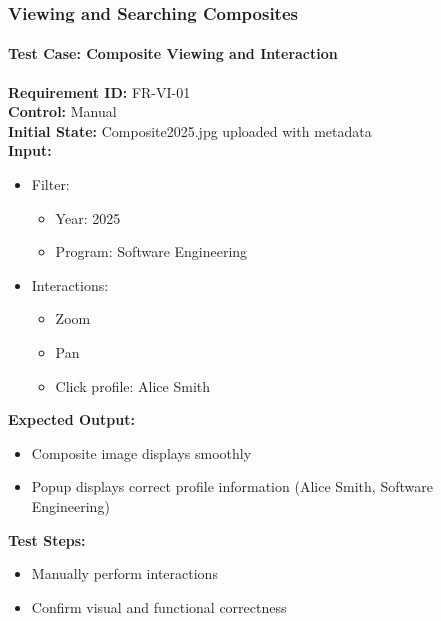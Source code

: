 \documentclass[12pt, titlepage]{article}
\begin{document}
\subsubsection{Viewing and Searching Composites}

\paragraph{Test Case: Composite Viewing and Interaction}
\textbf{Requirement ID:} FR-VI-01 \\
\textbf{Control:} Manual \\
\textbf{Initial State:} Composite2025.jpg uploaded with metadata \\
\textbf{Input:}
\begin{itemize}
    \item Filter:
    \begin{itemize}
        \item Year: 2025
        \item Program: Software Engineering
    \end{itemize}
    \item Interactions:
    \begin{itemize}
        \item Zoom
        \item Pan
        \item Click profile: Alice Smith
    \end{itemize}
\end{itemize}
\textbf{Expected Output:}
\begin{itemize}
    \item Composite image displays smoothly
    \item Popup displays correct profile information (Alice Smith, Software Engineering)
\end{itemize}
\textbf{Test Steps:}
\begin{itemize}
    \item Manually perform interactions
    \item Confirm visual and functional correctness
\end{itemize}
\end{document}
